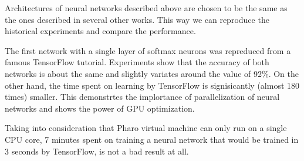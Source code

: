 Architectures of neural networks described above are chosen to be the same as the ones described in several other works. This way we can reproduce the historical experiments and compare the performance.

The first network with a single layer of softmax neurons was repreduced from a famous TensorFlow tutorial. Experiments show that the accuracy of both networks  is about the same and slightly variates around the value of 92\%. On the other hand, the time spent on learning by TensorFlow is signisicantly (almost 180 times) smaller. This demonstrtes the implortance of parallelization of neural networks and shows the power of GPU optimization.

Taking into consideration that Pharo virtual machine can only run on a single CPU core, 7 minutes spent on training a neural network that would be trained in 3 seconds by TensorFlow, is not a bad result at all.
